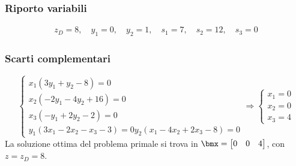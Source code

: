 \documentclass[\main/main.tex]{subfiles}
\begin{document}
\subsubsection*{Riporto variabili}

\begin{align*}
  z_D = 8, \quad
  y_1 = 0, \quad
  y_2 = 1, \quad
  s_1 = 7, \quad
  s_2 = 12, \quad
  s_3 = 0
\end{align*}
\subsubsection*{Scarti complementari}
\[
  \begin{cases}
    x_1(3y_1 + y_2  -8  ) = 0 \\
    x_2(-2y_1 -4y_2 +16) = 0  \\
    x_3(-y_1 + 2y_2 -2  ) = 0 \\
    y_1(3x_1 -2x_2 - x_3 -3) = 0
    y_2(x_1 -4x_2 + 2x_3 -8) = 0
  \end{cases}
  \Rightarrow
  \begin{cases}
    x_1 = 0 \\
    x_2 = 0 \\
    x_3= 4
  \end{cases}
\]
La soluzione ottima del problema primale si trova in $\bmx = \begin{bmatrix}
    0 & 0 & 4
  \end{bmatrix}$, con $z = z_D = 8$.
\end{document}
